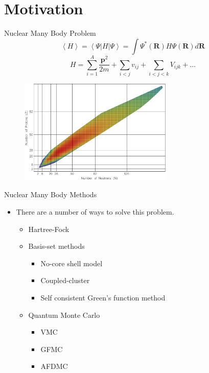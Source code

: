 \documentclass{beamer}
\newcommand{\ket}[1]{\left| #1 \right>}
\newcommand{\bra}[1]{\left< #1 \right|}
\begin{document}
\section{Motivation}
\begin{frame}{Nuclear Many Body Problem}
\vspace{-0.5cm}
\begin{equation*}
   \left<H\right> = \bra{\Psi}H\ket{\Psi} = \int\Psi^*(\bm{R})H\Psi(\bm{R}) d\bm{R}
\end{equation*}
\begin{equation*}
   H = \sum\limits_{i=1}^A \frac{\bm{p}^2}{2m} + \sum\limits_{i<j} v_{ij} + \sum\limits_{i<j<k} V_{ijk} + \ldots
\end{equation*}
\begin{figure}
   \includegraphics[width=0.65\textwidth]{../figures/tableofnuclides.pdf}
\end{figure}
\end{frame}

\begin{frame}{Nuclear Many Body Methods}
\begin{itemize}
   \item There are a number of ways to solve this problem.
   \begin{itemize}
      \item Hartree-Fock
      \item Basis-set methods
      \begin{itemize}
         \item No-core shell model
         \item Coupled-cluster
         \item Self consistent Green's function method
      \end{itemize}
      \item Quantum Monte Carlo
      \begin{itemize}
         \item VMC
         \item GFMC
         \item AFDMC
      \end{itemize}
   \end{itemize}
\end{itemize}
\end{frame}
\end{document}
